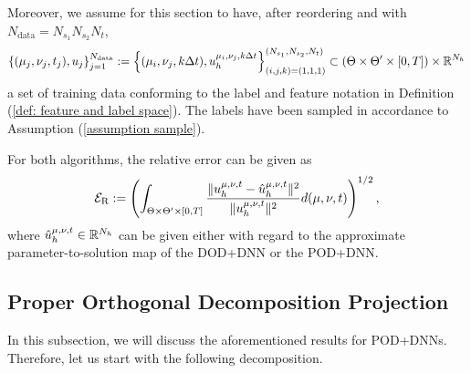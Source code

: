 Moreover, we assume for this section to have, after reordering and with $N_\text{data} = N_{s_1} N_{s_2} N_t$,
\begin{equation*}
    \left\{ (\mu_j, \nu_j, t_j), u_j \right\}_{j=1}^{N_\text{data}} :=
    \left\{(\mu_i, \nu_j, k \Delta t), u_h^{\mu_i, \nu_j, k \Delta t}\right\}_{(i, j, k)=(1, 1, 1)}^{(N_{s_1}, N_{s_2}, N_t)}
    \subset \left( \Theta \times \Theta' \times [0, T] \right) \times \mathbb{R}^{N_h}
\end{equation*}
a set of training data conforming to the label and feature notation in Definition (\ref{def: feature and label space}).
The labels have been sampled in accordance to Assumption (\ref{assumption sample}). 

For both algorithms, the relative error can be given as
\begin{equation} \label{eq: relative error}
    \mathcal{E}_\text{R} := \left( \int_{\Theta \times \Theta' \times [0, T]} \frac{\lVert u_h^{\mu, \nu, t} - \hat{u}_h^{\mu, \nu, t} \rVert^2}{\lVert u_h^{\mu, \nu, t} \rVert^2} 
    d(\mu, \nu, t)\right)^{1/2},
\end{equation}
where $\hat{u}_h^{\mu, \nu, t} \in \mathbb{R}^{N_h}$ can be given either with regard to the approximate parameter-to-solution map
of the DOD+DNN or the POD+DNN.






\subsection{Proper Orthogonal Decomposition Projection}





In this subsection, we will discuss the aforementioned results for POD+DNNs.
Therefore, let us start with the following decomposition.

